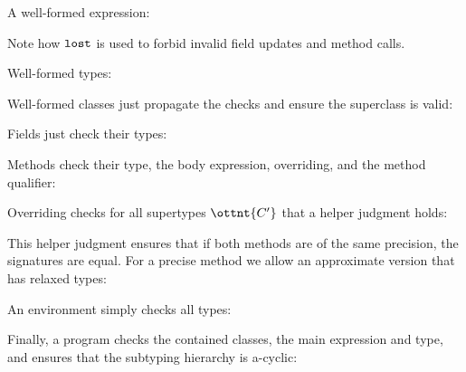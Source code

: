 A well-formed expression:

\vspace{0.5ex}
\ottdefntyperules{}
\vspace{2.0ex}


Note how $ \texttt{\upshape{lost}\,\!} $ is used to forbid invalid field updates and method
calls.


Well-formed types:

\vspace{0.5ex}
\ottdefnwftype{}
\vspace{2.0ex}


Well-formed classes just propagate the checks and ensure the
superclass is valid:

\vspace{0.5ex}
\ottdefnwfclass{}
\vspace{2.0ex}


Fields just check their types:

\vspace{0.5ex}
\ottdefnwffd{}
\vspace{2.0ex}


Methods check their type, the body expression, overriding, and the
method qualifier:

\vspace{0.5ex}
\ottdefnwfmd{}
\vspace{2.0ex}


Overriding checks for all supertypes $\ottnt{C'}$ that a helper judgment
holds:

\vspace{0.5ex}
\ottdefnoverride{}
\vspace{2.0ex}


This helper judgment ensures that if both methods are of the same
precision, the signatures are equal. For a precise method we allow an
approximate version that has relaxed types:

\vspace{0.5ex}
\ottdefnoverrideaux{}
\vspace{2.0ex}


An environment simply checks all types:

\vspace{0.5ex}
\ottdefnswfenv{}
\vspace{2.0ex}


Finally, a program checks the contained classes, the main expression
and type, and ensures that the subtyping hierarchy is a-cyclic:

\vspace{0.5ex}
\ottdefnwfprg{}
\vspace{2.0ex}




